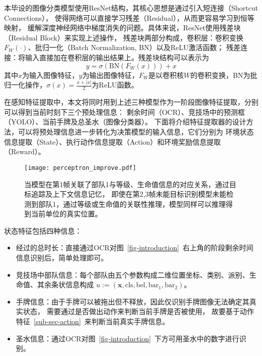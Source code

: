 本毕设的图像分类模型使用ResNet结构，其核心思想是通过引入短连接（Shortcut Connections），
使得网络可以直接学习残差（Residual），从而更容易学习到恒等映射，
缓解深度神经网络中梯度消失的问题。具体来说，ResNet使用残差块（Residual Block）来实现上述操作，
残差块两部分构成，卷积层：卷积变换$F_W(\cdot)$、批归一化（Batch Normalization, BN）以及ReLU激活函数；
残差连接：将输入直接加在卷积层的输出结果上。残差块结构可以表示为
\begin{equation}
  y = \sigma(\text{BN}(F_W(x))) + x
\end{equation}
其中$x$为输入图像特征，$y$为输出图像特征，$F_W$是以卷积核$W$的卷积变换，BN为批归一化操作，$\sigma(x)=\frac{x+|x|}{2}$为ReLU函数。

在感知特征提取中，本文将同时用到上述三种模型作为一阶段图像特征提取，分别可以得到当前时刻下三个预处理信息：
剩余时间（OCR）、竞技场中的预测框（YOLO）、当前手牌及总圣水（图像分类器）。
下面将介绍特征提取器的设计方法，可以将预处理信息进一步转化为决策模型的输入信息，它们分别为
环境状态信息提取（State）、执行动作信息提取（Action）和环境奖励信息提取（Reward）。
\begin{wrapfigure}[15]{r}{.5\textwidth} %
  \centering
  \vspace{-1ex}
  \texttt{[image: perceptron\_improve.pdf]}
  \caption{当模型在第1帧关联了部队1与等级、生命值信息的对应关系，通过目标追踪及上下文信息记忆，
  即使在第2,3帧未能目标识别模型未能检测到部队1，通过等级或生命值的关联性推理，模型同样可以推理得到当前单位的真实位置。}
  \label{fig-state-connect}
\end{wrapfigure}
\vspace{-4ex}
状态特征包括四种信息：
\begin{itemize}
  \item 经过的总时长：直接通过OCR对图~\ref{fig-introduction}~右上角的阶段剩余时间信息识别后，简单处理即可。
  \item 竞技场中部队信息：每个部队由五个参数构成二维位置坐标、类别、派别、生命值、其余条状信息构成
  $u:=(\boldsymbol{x}, \text{cls}, \text{bel}, \text{bar}_1, \text{bar}_2)$。
  \item 手牌信息：由于手牌可以被拖出但不释放，因此仅识别手牌图像无法确定其真实状态，
  需要通过是否做出动作来判断当前手牌是否被使用，
  故要基于动作特征~\ref{sub-sec-action}~来判断当前真实手牌信息。
  \item 圣水信息：通过OCR对图~\ref{fig-introduction}~下方可用圣水中的数字进行识别。
\end{itemize}

